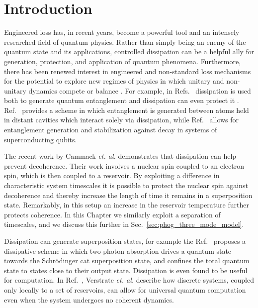 \section{Introduction}

Engineered loss has, in recent years, become a powerful tool and an intensely researched field of quantum physics. Rather than simply being an enemy of the quantum state and its applications, controlled dissipation can be a helpful ally for generation, protection, and application of quantum phenomena. Furthermore, there has been renewed interest in engineered and non-standard loss mechanisms for the potential to explore new regimes of physics in which unitary and non-unitary dynamics compete or balance \cite{Ozawa2018a, Lieu2018}. For example, in Refs.~\cite{Wolinsky1988, Braun2002, Clark2003, Roghani2018} dissipation is used both to generate quantum entanglement and dissipation can even protect it \cite{Zanardi1997}. Ref.~\cite{Clark2003} provides a scheme in which entanglement is generated between atoms held in distant cavities which interact solely via dissipation, while Ref.~\cite{Kimchi-Schwartz2016} allows for entanglement generation and stabilization against decay in systems of superconducting qubits. 

The recent work by Cammack \emph{et. al.} \cite{Cammack2018} demonstrates that dissipation can help prevent decoherence. Their work involves a nuclear spin coupled to an electron spin, which is then coupled to a reservoir. By exploiting a difference in characteristic system timescales it is possible to protect the nuclear spin against decoherence and thereby increase the length of time it remains in a superposition state. Remarkably, in this setup an increase in the reservoir temperature further protects coherence. In this Chapter we similarly exploit a separation of timescales, and we discuss this further in Sec.~\ref{sec:phog_three_mode_model}.

Dissipation can generate superposition states, for example the Ref.~\cite{Leghtas2015} proposes a dissipative scheme in which two-photon absorption drives a quantum state towards the Schr{\"o}dinger cat superposition state, and confines the total quantum state to states close to their output state. Dissipation is even found to be useful for computation. In Ref.~\cite{Verstraete2009}, Verstrate \emph{et. al.} describe how discrete systems, coupled only locally to a set of reservoirs, can allow for universal quantum computation even when the system undergoes no coherent dynamics.


